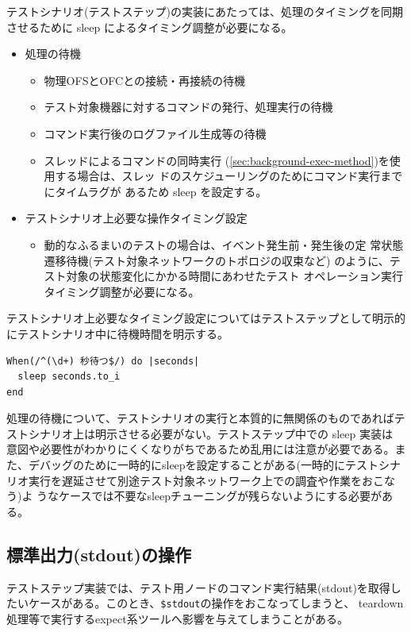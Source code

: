 テストシナリオ(テストステップ)の実装にあたっては、処理のタイミングを同期
させるために sleep によるタイミング調整が必要になる。
\begin{itemize}
 \item 処理の待機
       \begin{itemize}
        \item 物理OFSとOFCとの接続・再接続の待機
        \item テスト対象機器に対するコマンドの発行、処理実行の待機
        \item コマンド実行後のログファイル生成等の待機
        \item スレッドによるコマンドの同時実行
              (\ref{sec:background-exec-method})を使用する場合は、スレッ
              ドのスケジューリングのためにコマンド実行までにタイムラグが
              あるため sleep を設定する。
       \end{itemize}
 \item テストシナリオ上必要な操作タイミング設定
       \begin{itemize}
        \item 動的なふるまいのテストの場合は、イベント発生前・発生後の定
              常状態遷移待機(テスト対象ネットワークのトポロジの収束など)
              のように、テスト対象の状態変化にかかる時間にあわせたテスト
              オペレーション実行タイミング調整が必要になる。
       \end{itemize}
\end{itemize}

テストシナリオ上必要なタイミング設定についてはテストステップとして明示的
にテストシナリオ中に待機時間を明示する。
\begin{lstlisting}
When(/^(\d+) 秒待つ$/) do |seconds|
  sleep seconds.to_i
end
\end{lstlisting}

処理の待機について、テストシナリオの実行と本質的に無関係のものであればテ
ストシナリオ上は明示させる必要がない。テストステップ中での sleep 実装は
意図や必要性がわかりにくくなりがちであるため乱用には注意が必要である。ま
た、デバッグのために一時的にsleepを設定することがある(一時的にテストシナ
リオ実行を遅延させて別途テスト対象ネットワーク上での調査や作業をおこなう)よ
うなケースでは不要なsleepチューニングが残らないようにする必要がある。

  \subsection{標準出力(stdout)の操作}
テストステップ実装では、テスト用ノードのコマンド実行結果(stdout)を取得し
たいケースがある。このとき、\verb|$stdout|の操作をおこなってしまうと、
teardown処理等で実行するexpect系ツールへ影響を与えてしまうことがある。

